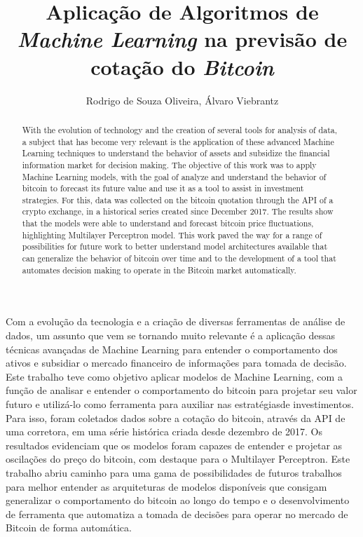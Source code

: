\documentclass[12pt]{article}
\title{
  Aplicação de Algoritmos de \textit{Machine Learning} na previsão de cotação do
  \textit{Bitcoin}
}
\author{
  Rodrigo de Souza Oliveira\inst{1}, 
  Álvaro Viebrantz \inst{1}
}
\begin{document}
 

\maketitle

\begin{abstract}
With the evolution of technology and the creation of several tools for analysis of
data, a subject that has become very relevant is the application of these
advanced Machine Learning techniques to understand the behavior of assets
and subsidize the financial information market for decision making. The objective 
of this work was to apply Machine Learning models, with the goal of
analyze and understand the behavior of bitcoin to forecast its future value
and use it as a tool to assist in investment strategies.
For this, data was collected on the bitcoin quotation through the API of
a crypto exchange, in a historical series created since December 2017.
The results show that the models were able to understand and
forecast bitcoin price fluctuations, highlighting Multilayer
Perceptron model. This work paved the way for a range of possibilities for
future work to better understand model architectures available
that can generalize the behavior of bitcoin over time and to the
development of a tool that automates decision making to operate
in the Bitcoin market automatically.
\end{abstract}
     
\begin{resumo} 
Com a evolução da tecnologia e a criação de diversas ferramentas de análise de
dados, um assunto que vem se tornando muito relevante é a aplicação dessas 
técnicas avançadas de Machine Learning para entender o comportamento dos ativos 
e subsidiar o mercado financeiro de informações para tomada de decisão. Este 
trabalho teve como objetivo aplicar modelos de Machine Learning, com a função de
analisar e entender o comportamento do bitcoin para projetar seu valor futuro 
e utilizá-lo como ferramenta para auxiliar nas estratégiasde investimentos. 
Para isso, foram coletados dados sobre a cotação do bitcoin, através da API de 
uma corretora, em uma série histórica criada desde dezembro de 2017. 
Os resultados evidenciam que os modelos foram capazes de entender e 
projetar as oscilações do preço do bitcoin, com destaque para o Multilayer 
Perceptron. Este trabalho abriu caminho para uma gama de possibilidades de 
futuros trabalhos para melhor entender as arquiteturas de modelos disponíveis 
que consigam generalizar o comportamento do bitcoin ao longo do tempo e o 
desenvolvimento de ferramenta que automatiza a tomada de decisões para operar
no mercado de Bitcoin de forma automática.
\end{resumo}
\end{document}
